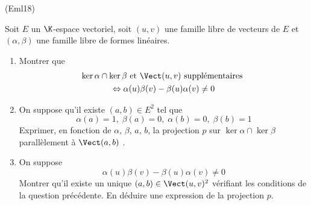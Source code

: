 \begin{tiny}(Eml18)\end{tiny} \label{inthyp2} Soit $E$ un $\K$-espace vectoriel, soit $(u,v)$ une famille libre de vecteurs de $E$ et $(\alpha, \beta)$ une famille libre de formes linéaires.
\begin{enumerate}
  \item Montrer que
\begin{multline*}
\ker \alpha \cap \ker \beta \text{ et } \Vect(u,v) \text{ supplémentaires }\\
\Leftrightarrow
  \alpha(u)\beta(v) - \beta(u)\alpha(v) \neq 0
\end{multline*}

  \item On suppose qu'il existe $(a,b)\in E^2$ tel que
\begin{displaymath}
  \alpha(a)=1,\;\beta(a)=0,\;\alpha(b)=0,\;\beta(b)=1
\end{displaymath}
Exprimer, en fonction de $\alpha$, $\beta$, $a$, $b$, la projection $p$ sur $\ker \alpha \cap \ker \beta$ parallèlement à $\Vect(a,b)$ .

  \item On suppose
\begin{displaymath}
  \alpha(u)\beta(v) - \beta(u)\alpha(v) \neq 0
\end{displaymath}
Montrer qu'il existe un unique $(a,b)\in \Vect(u,v)^2$ vérifiant les conditions de la question précédente. En déduire une expression de la projection $p$.
\end{enumerate}

